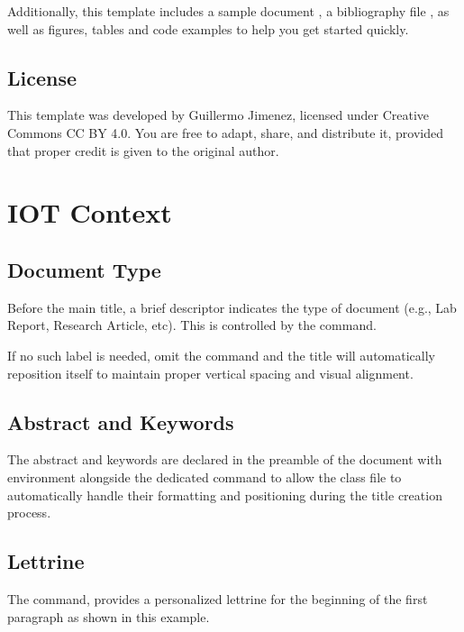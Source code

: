\documentclass[9pt,a4paper,twocolumn,twoside]{rho-class/rho}
\begin{document}
    Additionally, this template includes a sample document , a bibliography file , as well as figures, tables and code examples to help you get started quickly.

    \subsection{License}

        This template was developed by Guillermo Jimenez, licensed under Creative Commons CC BY 4.0. You are free to adapt, share, and distribute it, provided that proper credit is given to the original author.

\section{IOT Context}

    \subsection{Document Type}

        Before the main title, a brief descriptor indicates the type of document (e.g., Lab Report, Research Article, etc). This is controlled by the \inlinecode{\doctype{}} command. 
        
        If no such label is needed, omit the command and the title will automatically reposition itself to maintain proper vertical spacing and visual alignment.

    \subsection{Abstract and Keywords}

        The abstract and keywords are declared in the preamble of the document with  environment alongside the dedicated \inlinecode{\keywords{}} command to allow the class file to automatically handle their formatting and positioning during the title creation process.

    \subsection{Lettrine}

		The \inlinecode{\rhostart{}} command, provides a personalized lettrine for the beginning of the first paragraph as shown in this example.
\end{document}
